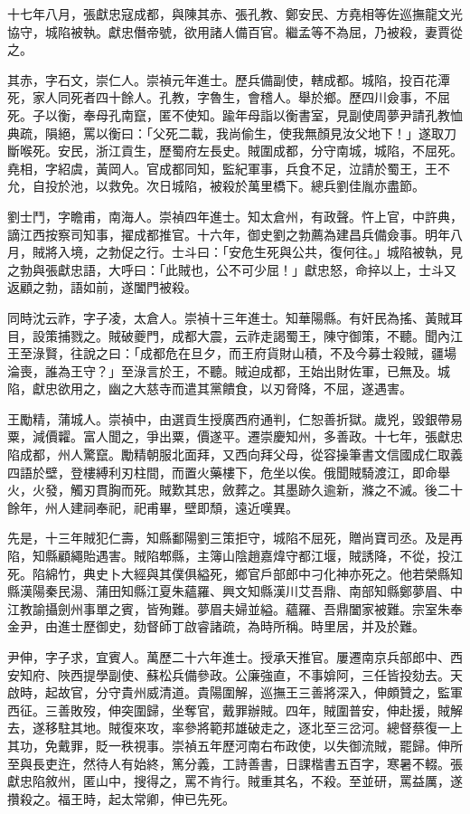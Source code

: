 \begin{pinyinscope}
十七年八月，張獻忠寇成都，與陳其赤、張孔教、鄭安民、方堯相等佐巡撫龍文光協守，城陷被執。獻忠僭帝號，欲用諸人備百官。繼孟等不為屈，乃被殺，妻賈從之。

其赤，字石文，崇仁人。崇禎元年進士。歷兵備副使，轄成都。城陷，投百花潭死，家人同死者四十餘人。孔教，字魯生，會稽人。舉於鄉。歷四川僉事，不屈死。子以衡，奉母孔南竄，匿不使知。踰年母詣以衡書室，見副使周夢尹請孔教恤典疏，隕絕，罵以衡曰：「父死二載，我尚偷生，使我無顏見汝父地下！」遂取刀斷喉死。安民，浙江貢生，歷蜀府左長史。賊圍成都，分守南城，城陷，不屈死。堯相，字紹虞，黃岡人。官成都同知，監紀軍事，兵食不足，泣請於蜀王，王不允，自投於池，以救免。次日城陷，被殺於萬里橋下。總兵劉佳胤亦盡節。

劉士鬥，字瞻甫，南海人。崇禎四年進士。知太倉州，有政聲。忤上官，中許典，謫江西按察司知事，擢成都推官。十六年，御史劉之勃薦為建昌兵備僉事。明年八月，賊將入境，之勃促之行。士斗曰：「安危生死與公共，復何往。」城陷被執，見之勃與張獻忠語，大呼曰：「此賊也，公不可少屈！」獻忠怒，命捽以上，士斗又返顧之勃，語如前，遂闔門被殺。

同時沈云祚，字子凌，太倉人。崇禎十三年進士。知華陽縣。有奸民為搖、黃賊耳目，設策捕戮之。賊破夔門，成都大震，云祚走謁蜀王，陳守御策，不聽。聞內江王至淥賢，往說之曰：「成都危在旦夕，而王府貨財山積，不及今募士殺賊，疆場淪喪，誰為王守？」至淥言於王，不聽。賊迫成都，王始出財佐軍，已無及。城陷，獻忠欲用之，幽之大慈寺而遣其黨饋食，以刃脅降，不屈，遂遇害。

王勵精，蒲城人。崇禎中，由選貢生授廣西府通判，仁恕善折獄。歲兇，毀銀帶易粟，減價糶。富人聞之，爭出粟，價遂平。遷崇慶知州，多善政。十七年，張獻忠陷成都，州人驚竄。勵精朝服北面拜，又西向拜父母，從容操筆書文信國成仁取義四語於壁，登樓縛利刃柱間，而置火藥樓下，危坐以俟。俄聞賊騎渡江，即命舉火，火發，觸刃貫胸而死。賊歎其忠，斂葬之。其墨跡久逾新，滌之不滅。後二十餘年，州人建祠奉祀，祀甫畢，壁即頹，遠近嘆異。

先是，十三年賊犯仁壽，知縣鄱陽劉三策拒守，城陷不屈死，贈尚寶司丞。及是再陷，知縣顧繩貽遇害。賊陷郫縣，主簿山陰趙嘉煒守都江堰，賊誘降，不從，投江死。陷綿竹，典史卜大經與其僕俱縊死，鄉官戶部郎中刁化神亦死之。他若榮縣知縣漢陽秦民湯、蒲田知縣江夏朱蘊羅、興文知縣漢川艾吾鼎、南部知縣鄭夢眉、中江教諭攝劍州事單之賓，皆殉難。夢眉夫婦並縊。蘊羅、吾鼎闔家被難。宗室朱奉金尹，由進士歷御史，劾督師丁啟睿諸疏，為時所稱。時里居，并及於難。

尹伸，字子求，宜賓人。萬歷二十六年進士。授承天推官。屢遷南京兵部郎中、西安知府、陜西提學副使、蘇松兵備參政。公廉強直，不事媕阿，三任皆投劾去。天啟時，起故官，分守貴州威清道。貴陽圍解，巡撫王三善將深入，伸頗贊之，監軍西征。三善敗歿，伸突圍歸，坐奪官，戴罪辦賊。四年，賊圍普安，伸赴援，賊解去，遂移駐其地。賊復來攻，率參將範邦雄破走之，逐北至三岔河。總督蔡復一上其功，免戴罪，貶一秩視事。崇禎五年歷河南右布政使，以失御流賊，罷歸。伸所至與長吏迕，然待人有始終，篤分義，工詩善書，日課楷書五百字，寒暑不輟。張獻忠陷敘州，匿山中，搜得之，罵不肯行。賊重其名，不殺。至並研，罵益厲，遂攢殺之。福王時，起太常卿，伸已先死。


\end{pinyinscope}
